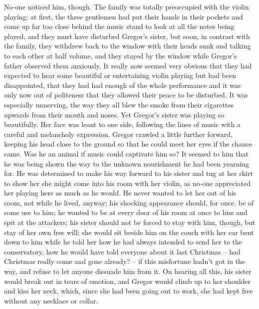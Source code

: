 No-one noticed him, though. The family was totally preoccupied with the
violin playing; at first, the three gentlemen had put their hands in
their pockets and come up far too close behind the music stand to look
at all the notes being played, and they must have disturbed Gregor’s
sister, but soon, in contrast with the family, they withdrew back to
the window with their heads sunk and talking to each other at half
volume, and they stayed by the window while Gregor’s father observed
them anxiously. It really now seemed very obvious that they had
expected to hear some beautiful or entertaining violin playing but had
been disappointed, that they had had enough of the whole performance
and it was only now out of politeness that they allowed their peace to
be disturbed. It was especially unnerving, the way they all blew the
smoke from their cigarettes upwards from their mouth and noses. Yet
Gregor’s sister was playing so beautifully. Her face was leant to one
side, following the lines of music with a careful and melancholy
expression. Gregor crawled a little further forward, keeping his head
close to the ground so that he could meet her eyes if the chance came.
Was he an animal if music could captivate him so? It seemed to him that
he was being shown the way to the unknown nourishment he had been
yearning for. He was determined to make his way forward to his sister
and tug at her skirt to show her she might come into his room with her
violin, as no-one appreciated her playing here as much as he would. He
never wanted to let her out of his room, not while he lived, anyway;
his shocking appearance should, for once, be of some use to him; he
wanted to be at every door of his room at once to hiss and spit at the
attackers; his sister should not be forced to stay with him, though,
but stay of her own free will; she would sit beside him on the couch
with her ear bent down to him while he told her how he had always
intended to send her to the conservatory, how he would have told
everyone about it last Christmas – had Christmas really come and gone
already? – if this misfortune hadn’t got in the way, and refuse to let
anyone dissuade him from it. On hearing all this, his sister would
break out in tears of emotion, and Gregor would climb up to her
shoulder and kiss her neck, which, since she had been going out to
work, she had kept free without any necklace or collar.

